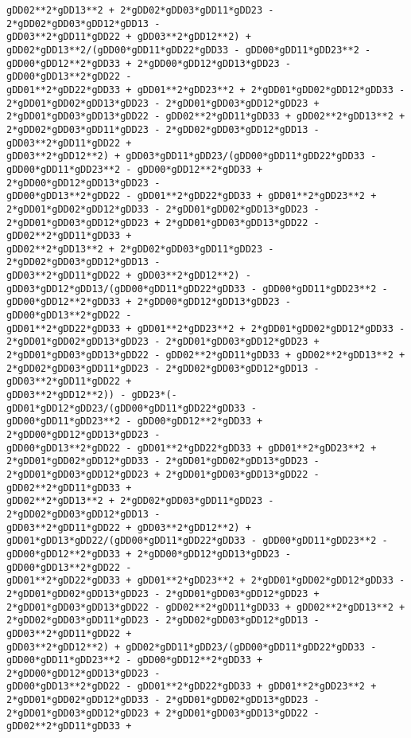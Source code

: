 \documentclass[landscape,letterpaper,10pt,english]{article}
\begin{document}
\begin{Verbatim}[commandchars=\\\{\}]
gDD02**2*gDD13**2 + 2*gDD02*gDD03*gDD11*gDD23 - 2*gDD02*gDD03*gDD12*gDD13 -
gDD03**2*gDD11*gDD22 + gDD03**2*gDD12**2) +
gDD02*gDD13**2/(gDD00*gDD11*gDD22*gDD33 - gDD00*gDD11*gDD23**2 -
gDD00*gDD12**2*gDD33 + 2*gDD00*gDD12*gDD13*gDD23 - gDD00*gDD13**2*gDD22 -
gDD01**2*gDD22*gDD33 + gDD01**2*gDD23**2 + 2*gDD01*gDD02*gDD12*gDD33 -
2*gDD01*gDD02*gDD13*gDD23 - 2*gDD01*gDD03*gDD12*gDD23 +
2*gDD01*gDD03*gDD13*gDD22 - gDD02**2*gDD11*gDD33 + gDD02**2*gDD13**2 +
2*gDD02*gDD03*gDD11*gDD23 - 2*gDD02*gDD03*gDD12*gDD13 - gDD03**2*gDD11*gDD22 +
gDD03**2*gDD12**2) + gDD03*gDD11*gDD23/(gDD00*gDD11*gDD22*gDD33 -
gDD00*gDD11*gDD23**2 - gDD00*gDD12**2*gDD33 + 2*gDD00*gDD12*gDD13*gDD23 -
gDD00*gDD13**2*gDD22 - gDD01**2*gDD22*gDD33 + gDD01**2*gDD23**2 +
2*gDD01*gDD02*gDD12*gDD33 - 2*gDD01*gDD02*gDD13*gDD23 -
2*gDD01*gDD03*gDD12*gDD23 + 2*gDD01*gDD03*gDD13*gDD22 - gDD02**2*gDD11*gDD33 +
gDD02**2*gDD13**2 + 2*gDD02*gDD03*gDD11*gDD23 - 2*gDD02*gDD03*gDD12*gDD13 -
gDD03**2*gDD11*gDD22 + gDD03**2*gDD12**2) -
gDD03*gDD12*gDD13/(gDD00*gDD11*gDD22*gDD33 - gDD00*gDD11*gDD23**2 -
gDD00*gDD12**2*gDD33 + 2*gDD00*gDD12*gDD13*gDD23 - gDD00*gDD13**2*gDD22 -
gDD01**2*gDD22*gDD33 + gDD01**2*gDD23**2 + 2*gDD01*gDD02*gDD12*gDD33 -
2*gDD01*gDD02*gDD13*gDD23 - 2*gDD01*gDD03*gDD12*gDD23 +
2*gDD01*gDD03*gDD13*gDD22 - gDD02**2*gDD11*gDD33 + gDD02**2*gDD13**2 +
2*gDD02*gDD03*gDD11*gDD23 - 2*gDD02*gDD03*gDD12*gDD13 - gDD03**2*gDD11*gDD22 +
gDD03**2*gDD12**2)) - gDD23*(-gDD01*gDD12*gDD23/(gDD00*gDD11*gDD22*gDD33 -
gDD00*gDD11*gDD23**2 - gDD00*gDD12**2*gDD33 + 2*gDD00*gDD12*gDD13*gDD23 -
gDD00*gDD13**2*gDD22 - gDD01**2*gDD22*gDD33 + gDD01**2*gDD23**2 +
2*gDD01*gDD02*gDD12*gDD33 - 2*gDD01*gDD02*gDD13*gDD23 -
2*gDD01*gDD03*gDD12*gDD23 + 2*gDD01*gDD03*gDD13*gDD22 - gDD02**2*gDD11*gDD33 +
gDD02**2*gDD13**2 + 2*gDD02*gDD03*gDD11*gDD23 - 2*gDD02*gDD03*gDD12*gDD13 -
gDD03**2*gDD11*gDD22 + gDD03**2*gDD12**2) +
gDD01*gDD13*gDD22/(gDD00*gDD11*gDD22*gDD33 - gDD00*gDD11*gDD23**2 -
gDD00*gDD12**2*gDD33 + 2*gDD00*gDD12*gDD13*gDD23 - gDD00*gDD13**2*gDD22 -
gDD01**2*gDD22*gDD33 + gDD01**2*gDD23**2 + 2*gDD01*gDD02*gDD12*gDD33 -
2*gDD01*gDD02*gDD13*gDD23 - 2*gDD01*gDD03*gDD12*gDD23 +
2*gDD01*gDD03*gDD13*gDD22 - gDD02**2*gDD11*gDD33 + gDD02**2*gDD13**2 +
2*gDD02*gDD03*gDD11*gDD23 - 2*gDD02*gDD03*gDD12*gDD13 - gDD03**2*gDD11*gDD22 +
gDD03**2*gDD12**2) + gDD02*gDD11*gDD23/(gDD00*gDD11*gDD22*gDD33 -
gDD00*gDD11*gDD23**2 - gDD00*gDD12**2*gDD33 + 2*gDD00*gDD12*gDD13*gDD23 -
gDD00*gDD13**2*gDD22 - gDD01**2*gDD22*gDD33 + gDD01**2*gDD23**2 +
2*gDD01*gDD02*gDD12*gDD33 - 2*gDD01*gDD02*gDD13*gDD23 -
2*gDD01*gDD03*gDD12*gDD23 + 2*gDD01*gDD03*gDD13*gDD22 - gDD02**2*gDD11*gDD33 +

\end{Verbatim}
\end{document}
